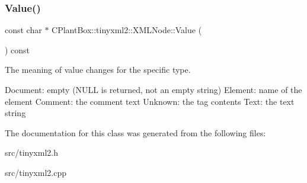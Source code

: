 \subsubsection{\texorpdfstring{Value()}{Value()}}
{\footnotesize\ttfamily const char $\ast$ C\+Plant\+Box\+::tinyxml2\+::\+X\+M\+L\+Node\+::\+Value (\begin{DoxyParamCaption}{ }\end{DoxyParamCaption}) const}

The meaning of \textquotesingle{}value\textquotesingle{} changes for the specific type. \begin{DoxyVerb}Document:   empty (NULL is returned, not an empty string)
Element:    name of the element
Comment:    the comment text
Unknown:    the tag contents
Text:       the text string
\end{DoxyVerb}
 

The documentation for this class was generated from the following files\+:\begin{DoxyCompactItemize}
\item 
src/tinyxml2.\+h\item 
src/tinyxml2.\+cpp\end{DoxyCompactItemize}
